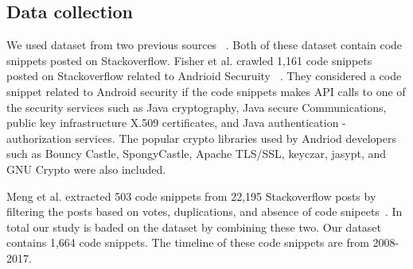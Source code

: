 \subsection{Data collection} 
  We used dataset from two previous sources ~\cite{meng2018secure,fischer2017stack}. Both of these dataset contain code snippets posted on Stackoverflow. 
  Fisher et al. crawled 1,161 code snippets posted on Stackoverflow related to Andrioid Securuity ~\cite{fischer2017stack}. They considered a code snippet related to Android security if the code snippets makes API calls to
  one of the security services such as Java cryptography, Java secure Communications, public key infrastructure X.509 certificates, and Java authentication - authorization services. The popular crypto libraries used by Andriod developers such as Bouncy Castle, SpongyCastle, Apache TLS/SSL, keyczar, jasypt, and GNU Crypto were also included. 
  
  Meng et al.  extracted 503 code snippets from 22,195 Stackoverflow posts by filtering the posts based on votes, duplications, and absence of code snipeets~\cite{meng2018secure}. In total our study is baded on the dataset by combining these two. Our dataset contains 1,664 code snippets. The timeline of these code snippets are from 2008-2017.
